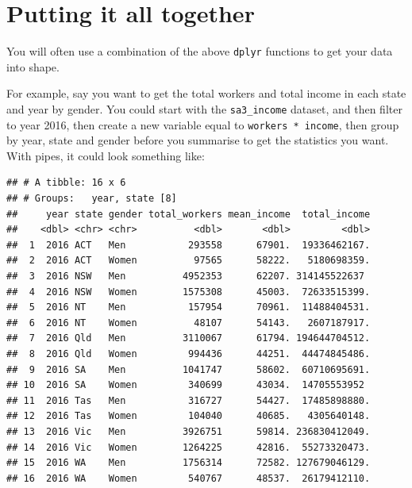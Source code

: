 \documentclass[]{book}
\newenvironment{Shaded}{\begin{snugshade}}{\end{snugshade}}
\newcommand{\DataTypeTok}[1]{\textcolor[rgb]{0.13,0.29,0.53}{#1}}
\newcommand{\DecValTok}[1]{\textcolor[rgb]{0.00,0.00,0.81}{#1}}
\newcommand{\KeywordTok}[1]{\textcolor[rgb]{0.13,0.29,0.53}{\textbf{#1}}}
\newcommand{\NormalTok}[1]{#1}
\newcommand{\OperatorTok}[1]{\textcolor[rgb]{0.81,0.36,0.00}{\textbf{#1}}}
\newcommand{\StringTok}[1]{\textcolor[rgb]{0.31,0.60,0.02}{#1}}
\begin{document}
\hypertarget{putting-it-all-together}{%
\section{Putting it all together}\label{putting-it-all-together}}

You will often use a combination of the above \texttt{dplyr} functions to get your data into shape.

For example, say you want to get the total workers and total income in each state and year by gender. You could start with the \texttt{sa3\_income} dataset, and then filter to year 2016, then create a new variable equal to \texttt{workers\ *\ income}, then group by year, state and gender before you summarise to get the statistics you want. With pipes, it could look something like:

\begin{Shaded}
\end{Shaded}

\begin{verbatim}
## # A tibble: 16 x 6
## # Groups:   year, state [8]
##     year state gender total_workers mean_income  total_income
##    <dbl> <chr> <chr>          <dbl>       <dbl>         <dbl>
##  1  2016 ACT   Men           293558      67901.  19336462167.
##  2  2016 ACT   Women          97565      58222.   5180698359.
##  3  2016 NSW   Men          4952353      62207. 314145522637 
##  4  2016 NSW   Women        1575308      45003.  72633515399.
##  5  2016 NT    Men           157954      70961.  11488404531.
##  6  2016 NT    Women          48107      54143.   2607187917.
##  7  2016 Qld   Men          3110067      61794. 194644704512.
##  8  2016 Qld   Women         994436      44251.  44474845486.
##  9  2016 SA    Men          1041747      58602.  60710695691.
## 10  2016 SA    Women         340699      43034.  14705553952 
## 11  2016 Tas   Men           316727      54427.  17485898880.
## 12  2016 Tas   Women         104040      40685.   4305640148.
## 13  2016 Vic   Men          3926751      59814. 236830412049.
## 14  2016 Vic   Women        1264225      42816.  55273320473.
## 15  2016 WA    Men          1756314      72582. 127679046129.
## 16  2016 WA    Women         540767      48537.  26179412110.
\end{verbatim}
\end{document}
